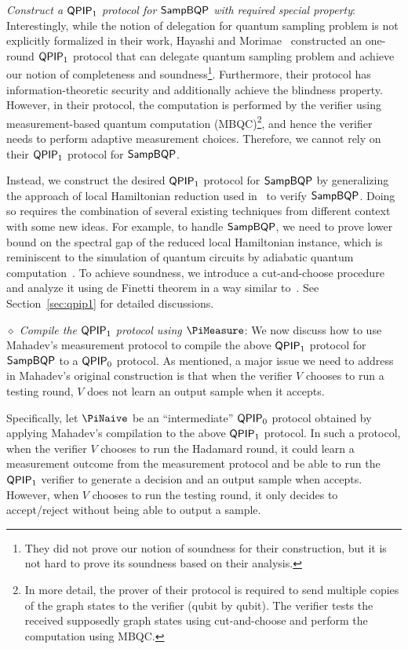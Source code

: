 \emph{Construct a $\operatorname{\mathsf{QPIP}}_1$ protocol for $\operatorname{\mathsf{SampBQP}}$ with required special property}: Interestingly, while the notion of delegation for quantum sampling problem is not explicitly formalized in their work, Hayashi and Morimae~\cite{hayashi2015verifiable} constructed an one-round $\operatorname{\mathsf{QPIP}}_1$ protocol that can delegate quantum sampling problem and achieve our notion of completeness and soundness\footnote{They did not prove our notion of soundness for their construction, but it is not hard to prove its soundness based on their analysis.}. Furthermore, their protocol has information-theoretic security and additionally achieve the blindness property. However, in their protocol, the computation is performed by the verifier using measurement-based quantum computation (MBQC)\footnote{In more detail, the prover of their protocol is required to send multiple copies of the graph states to the verifier (qubit by qubit). The verifier tests the received supposedly graph states using cut-and-choose and perform the computation using MBQC.}, and hence the verifier needs to perform adaptive measurement choices. Therefore, we cannot rely on their $\operatorname{\mathsf{QPIP}}_1$ protocol for $\operatorname{\mathsf{SampBQP}}$. 

Instead, we construct the desired $\operatorname{\mathsf{QPIP}}_1$ protocol for $\operatorname{\mathsf{SampBQP}}$ by generalizing the approach of local Hamiltonian reduction used in~\cite{PhysRevA.93.022326, mf16} to verify $\operatorname{\mathsf{SampBQP}}$. Doing so requires the combination of several existing techniques from different context with some new ideas. For example, to handle $\operatorname{\mathsf{SampBQP}}$, we need to prove lower bound on the spectral gap of the reduced local Hamiltonian instance, which is reminiscent to the simulation of quantum circuits by adiabatic quantum computation~\cite{adiabatic}. To achieve soundness, we introduce a cut-and-choose procedure and analyze it using de Finetti theorem in a  way similar to~\cite{takeuchi2018verification,hayashi2015verifiable}. See Section~\ref{sec:qpip1} for detailed discussions.



\emph{$\diamond$ Compile the $\operatorname{\mathsf{QPIP}}_1$ protocol using $\PiMeasure$}: We now discuss how to use Mahadev's measurement protocol to compile the above $\operatorname{\mathsf{QPIP}}_1$ protocol for $\operatorname{\mathsf{SampBQP}}$ to a $\operatorname{\mathsf{QPIP}}_0$ protocol. As mentioned, a major issue we need to address in Mahadev's original construction is that when the verifier $V$ chooses to run a testing round, $V$ does not learn an output sample when it accepts.  %

Specifically, let $\PiNaive$ be an ``intermediate'' $\operatorname{\mathsf{QPIP}}_0$ protocol obtained by applying Mahadev's compilation to the above $\operatorname{\mathsf{QPIP}}_1$ protocol. In such a protocol, when the verifier $V$ chooses to run the Hadamard round, it could learn a measurement outcome from the measurement protocol and be able to run the $\operatorname{\mathsf{QPIP}}_1$ verifier to generate a decision and an output sample when accepts. However, when  $V$ chooses to run the testing round, it only decides to accept/reject without being able to output a sample. 

